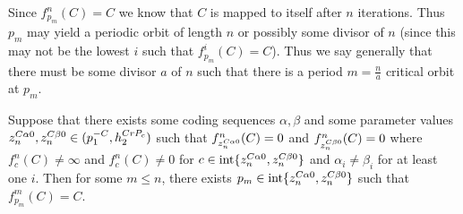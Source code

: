 		\begin{myproof}
			Since $f^n_{p_m} (C)= C$ we know that $C$ is mapped to itself after $n$ iterations. Thus $p_m$ may yield a periodic orbit of length $n$ or possibly some divisor of $n$ (since this may not be the lowest $i$ such that $f^i_{p_m} (C)= C$). Thus we say generally that there must be some divisor $a$ of $n$ such that there is a period $m = \frac{n}{a}$ critical orbit at $p_m$.
		\end{myproof}




		\begin{mylemma} \label{golden}
			Suppose that there exists some coding sequences $\alpha, \beta$ and some parameter values $z_n^{C\alpha 0}, z_n^{C\beta 0} \in (p^{-C}_1, h^{CrP_c}_2)$ such that $f^{n}_{z_n^{C\alpha 0}} (C)= 0$ and $f^{n}_{z_n^{C\beta 0}} (C) = 0$ where $f^n_{c} (C) \neq \infty$ and $f^n_{c} (C) \neq 0$ for $c  \in \text{int}\{z_n^{C\alpha 0},z_n^{C\beta 0}\}$ and $\alpha_i \neq \beta_i$ for at least one $i$. Then for some $m \leq n$, there exists $p_m\in \text{int}\{z_n^{C\alpha 0},z_n^{C\beta 0}\}$ such that $f^m_{p_m} (C) = C$.
		\end{mylemma}

